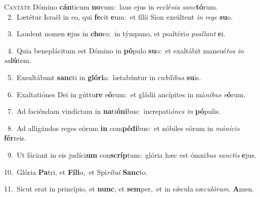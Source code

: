 \lettrine{\initial\textcolor{\initialcolor}{C}}{antáte} Dómino \textbf{cán}\-ticum \textbf{no}\-vum:~\star laus ejus in ecclé\-\textit{si}\-\textit{a} \textit{sanc}\-\textbf{tó}rum.\\
{\numbfont\textcolor{\numbcolor}{~2.}}~Lætétur Israël in eo, qui \textbf{fe}\-cit \textbf{e}\-um:~\star et fílii Sion exsúltent \textit{in} \textit{re}\-\textit{ge} \textbf{su}\-o.\par
{\numbfont\textcolor{\numbcolor}{~3.}}~Laudent nomen \textbf{e}\-jus in \textbf{cho}\-ro:~\star in týmpano, et psaltéri\textit{o} \textit{psal}\-\textit{lant} \textbf{e}\-i.\par
{\numbfont\textcolor{\numbcolor}{~4.}}~Quia beneplácitum est Dómino in \textbf{pó}\-pulo \textbf{su}\-o:~\star et exaltábit mansué\textit{tos} \textit{in} \textit{sa}\-\textbf{lú}tem.\par
{\numbfont\textcolor{\numbcolor}{~5.}}~Exsultábunt \textbf{sanc}\-ti in \textbf{gló}\-\textbf{ri}a:~\star lætabúntur in cu\-\textit{bí}\-\textit{li}\textit{bus} \textbf{su}\-is.\par
{\numbfont\textcolor{\numbcolor}{~6.}}~Exaltatiónes Dei in gúttu\textbf{re} e\-\textbf{ó}\-rum:~\star et gládii ancípites in má\-\textit{ni}\-\textit{bus} \textit{e}\-\textbf{ó}rum.\par
{\numbfont\textcolor{\numbcolor}{~7.}}~Ad faciéndam vindíctam in \textbf{na}\-ti\-\textbf{ó}\-\textbf{ni}bus:~\star increpati\-\textit{ó}\-\textit{nes} \textit{in} \textbf{pó}\-pulis.\par
{\numbfont\textcolor{\numbcolor}{~8.}}~Ad alligándos reges eórum \textbf{in} com\-\textbf{pé}\-\textbf{di}bus:~\star et nóbiles eórum in \textit{má}\-\textit{ni}\textit{cis} \textbf{fér}\-reis.\par
{\numbfont\textcolor{\numbcolor}{~9.}}~Ut fáciant in eis judíci\textbf{um} con\-\textbf{scríp}\-tum:~\star glória hæc est ómni\textit{bus} \textit{sanc}\-\textit{tis} \textbf{e}\-jus.\par
{\numbfont\textcolor{\numbcolor}{10.}}~Glória \textbf{Pa}\-tri, et \textbf{Fí}\-\textbf{li}o,~\star et Spi\-\textit{rí}\-\textit{tu}\textit{i} \textbf{Sanc}\-to.\par
{\numbfont\textcolor{\numbcolor}{11.}}~Sicut erat in princípio, et \textbf{nunc}\-, et \textbf{sem}\-per,~\star et in sǽcula sæ\-\textit{cu}\-\textit{ló}\textit{rum}. \textbf{A}\-men.\par
